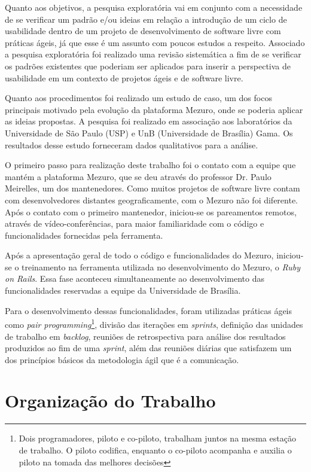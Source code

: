Quanto aos objetivos, a pesquisa exploratória vai em conjunto com a necessidade de se verificar um padrão e/ou ideias em relação a introdução de um ciclo de usabilidade dentro de um projeto de desenvolvimento de software livre com práticas ágeis, já que esse é um assunto com poucos estudos a respeito. Associado a pesquisa exploratória foi realizado uma revisão sistemática a fim de se verificar os padrões existentes que poderiam ser aplicados para inserir a perspectiva de usabilidade em um contexto de projetos ágeis e de software livre.

Quanto aos procedimentos foi realizado um estudo de caso, um dos focos principais motivado pela evolução da plataforma Mezuro, onde se poderia aplicar as ideias propostas. A pesquisa foi realizado em associação aos laboratórios da Universidade de São Paulo (USP) e UnB (Universidade de Brasília) Gama. Os resultados desse estudo forneceram dados qualitativos para a análise.

O primeiro passo para realização deste trabalho foi o contato com a equipe que mantém a plataforma Mezuro, que se deu através do professor Dr. Paulo Meirelles, um dos mantenedores. Como muitos projetos de software livre contam com desenvolvedores distantes geograficamente, com o Mezuro não foi diferente. Após o contato com o primeiro mantenedor, iniciou-se os pareamentos remotos, através de vídeo-conferências, para maior familiaridade com o código e funcionalidades fornecidas pela ferramenta.

Após a apresentação geral de todo o código e funcionalidades do Mezuro, iniciou-se o treinamento na ferramenta utilizada no desenvolvimento do Mezuro, o \textit{Ruby on Rails}. Essa fase aconteceu simultaneamente ao desenvolvimento das funcionalidades reservadas a equipe da Universidade de Brasília.

Para o desenvolvimento dessas funcionalidades, foram utilizadas práticas ágeis como \textit{pair programming}\footnote{Dois programadores, piloto e co-piloto, trabalham juntos na mesma estação de trabalho. O piloto codifica, enquanto o co-piloto acompanha e auxilia o piloto na tomada das melhores decisões}, divisão das iterações em \textit{sprints}, definição das unidades de trabalho em \textit{backlog}, reuniões de retrospectiva para análise dos resultados produzidos ao fim de uma \textit{sprint}, além das reuniões diárias que satisfazem um dos princípios básicos da metodologia ágil que é a comunicação.

\section{Organização do Trabalho}

